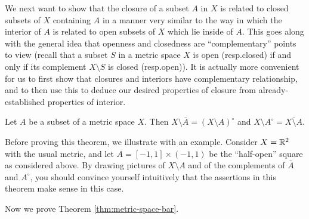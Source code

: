 We next want to show that the closure of a subset \(A\) in \(X\) is related
to closed subsets of \(X\) containing \(A\) in a manner very similar to the
way in which the interior of \(A\) is related to open subsets of \(X\)
which lie inside of \(A\). This goes along with the general idea that
openness and closedness are ``complementary'' points to view (recall that a
subset \(S\) in a metric space \(X\) is open (resp.\@ closed) if and only
if its complement \(X\setminus S\) is closed (resp.\@ open)). It is
actually more convenient for us to first show that closures and interiors
have complementary relationship, and to then use this to deduce our desired
properties of closure from already-established properties of interior.

\begin{theorem}
  \label{thm:metric-space-bar}
  Let \(A\) be a subset of a metric space \(X\). Then
  \(X\setminus\bar A=(X\setminus A)^\circ\) and
  \(X\setminus A^\circ=\overline{X\setminus A}\).
\end{theorem}
Before proving this theorem, we illustrate with an example. Consider
\(X=\mathbb{R}^2\) with the usual metric, and let \(A=[-1,1]\times(-1,1)\) be the
``half-open'' square as considered above. By drawing pictures of
\(X\setminus A\) and of the complements of \(\bar A\) and \(A^\circ\), you
should convince yourself intuitively that the assertions in this theorem
make sense in this case.

Now we prove Theorem \ref{thm:metric-space-bar}.

